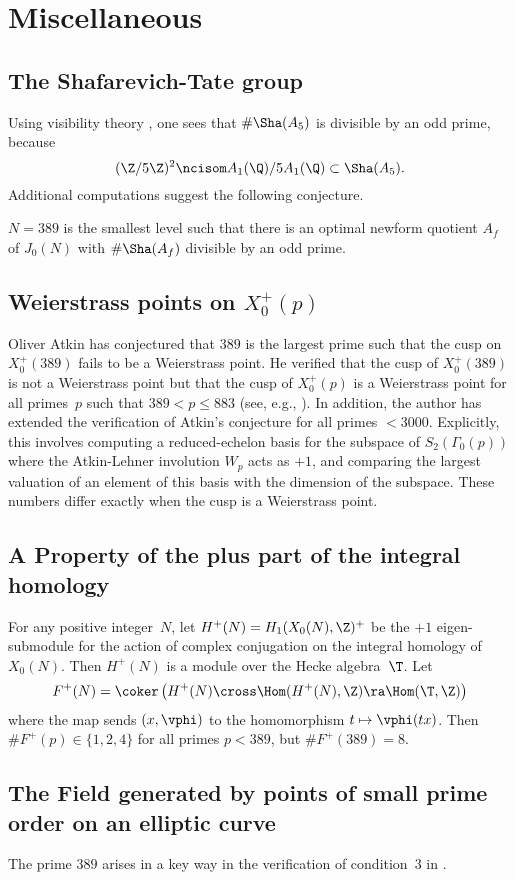 \documentclass{report}
\begin{document}
\section{Miscellaneous}

\subsection{The Shafarevich-Tate group}\label{sec:sha}
Using visibility theory \cite[\S4.2]{agashe-stein:visibility},
one sees that $\#\Sha(A_5)$ is divisible by an odd prime, because
$$
 (\Z/5\Z)^2 \ncisom A_1(\Q)/5 A_1(\Q) \subset \Sha(A_{5}).
$$
Additional computations suggest the following conjecture.
\begin{conjecture}
$N=389$ is the smallest level such that there is an optimal newform
quotient $A_f$ of $J_0(N)$ with $\#\Sha(A_f)$
divisible by an odd prime.
\end{conjecture}


\subsection{Weierstrass points on $X_0^+(p)$}\label{sec:atkin}
Oliver Atkin has conjectured that $389$ is the largest prime such that
the cusp on $X_0^+(389)$ fails to be a Weierstrass point.  He verified
that the cusp of $X_0^+(389)$ is not a Weierstrass point but
that the cusp of $X_0^+(p)$ is a Weierstrass point for all primes~$p$
such that $389<p\leq 883$ (see, e.g., \cite[pg.39]{elkies:ffield}).
In addition, the author has extended the verification of Atkin's conjecture
for all primes $<3000$.    Explicitly, this involves computing a reduced-echelon
basis for the subspace of $S_2(\Gamma_0(p))$ where the Atkin-Lehner involution
$W_p$ acts as $+1$, and comparing the largest valuation of an element of this
basis with the dimension of the subspace.  These numbers differ exactly when
the cusp is a Weierstrass point.



\subsection{A Property of the plus part of the integral homology}
For any positive integer~$N$, let $H^+(N) = H_1(X_0(N),\Z)^+$ be the
$+1$ eigen-submodule for the action of complex conjugation on the
integral homology of $X_0(N)$.  Then $H^+(N)$ is a module over the
Hecke algebra~$\T$.  Let
$$
 F^+(N) = \coker\left(H^+(N) \cross \Hom(H^+(N),\Z) \ra \Hom(\T,\Z)\right)
$$
where the map sends $(x,\vphi)$ to the homomorphism
$t\mapsto \vphi(tx)$.  Then $\#F^+(p)\in \{1,2,4\}$ for
all primes $p<389$, but $\#F^+(389) = 8$.

\subsection{The Field generated by points of
   small prime order on an elliptic curve}
The prime $389$ arises in a key way in the verification of condition~3
in \cite{merel-stein}.




\end{document}
